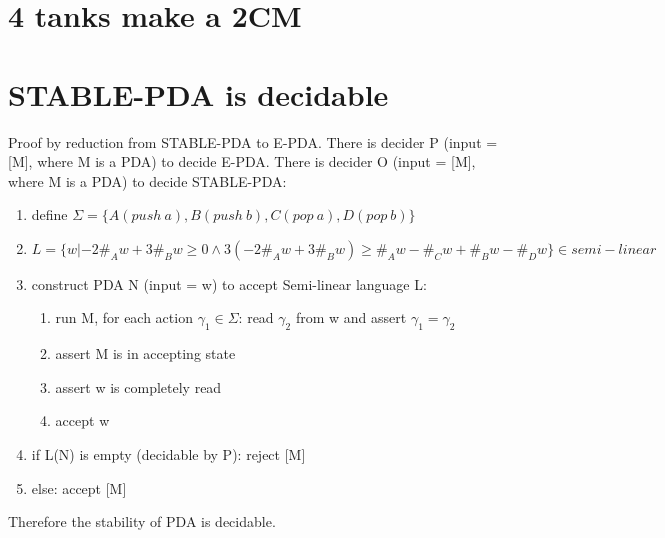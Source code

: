 \documentclass{article}
\begin{document}
\section{4 tanks make a 2CM}

\section{STABLE-PDA is decidable}
Proof by reduction from STABLE-PDA to E-PDA.
There is decider P (input = [M], where M is a PDA) to decide E-PDA.
There is decider O (input = [M], where M is a PDA) to decide STABLE-PDA:
\begin{enumerate}
	\item define $ \Sigma = \{A(push \ a), B(push \ b), C(pop \ a), D(pop \ 
	b)\} $
	\item $ L = \{w |  -2\#_Aw + 3\#_Bw \ge 0
	\land  3(-2\#_Aw + 3\#_Bw) \ge \#_Aw-\#_Cw + \#_Bw-\#_Dw\} \in semi-linear$
	\item construct PDA N (input = w) to accept Semi-linear language L:
	\begin{enumerate}
		\item run M, for each action $ \gamma_1 \in \Sigma $: read $ \gamma_2 $ 
		from w and assert $ \gamma_1 = \gamma_2 $
		\item assert M is in accepting state
		\item assert w is completely read
		\item accept w
	\end{enumerate}
	\item if L(N) is empty (decidable by P): reject [M]
	\item else: accept [M]
\end{enumerate}
Therefore the stability of PDA is decidable.
\end{document}
